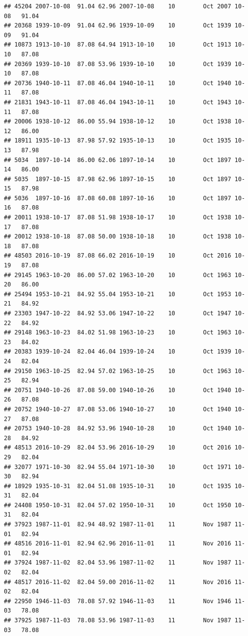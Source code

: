 \documentclass{article}\usepackage[]{graphicx}\usepackage[]{color}
\makeatletter
\newenvironment{kframe}{%
 \def\at@end@of@kframe{}%
 \ifinner\ifhmode%
  \def\at@end@of@kframe{\end{minipage}}%
  \begin{minipage}{\columnwidth}%
 \fi\fi%
 \def\FrameCommand##1{\hskip\@totalleftmargin \hskip-\fboxsep
 \colorbox{shadecolor}{##1}\hskip-\fboxsep
     \hskip-\linewidth \hskip-\@totalleftmargin \hskip\columnwidth}%
 \MakeFramed {\advance\hsize-\width
   \@totalleftmargin\z@ \linewidth\hsize
   \@setminipage}}%
 {\par\unskip\endMakeFramed%
 \at@end@of@kframe}
\newenvironment{knitrout}{}{} %
\makeatother
\begin{document}
\begin{knitrout}
\begin{kframe}
\begin{verbatim}
## 45204 2007-10-08  91.04 62.96 2007-10-08    10        Oct 2007 10-08   91.04
## 20368 1939-10-09  91.04 62.96 1939-10-09    10        Oct 1939 10-09   91.04
## 10873 1913-10-10  87.08 64.94 1913-10-10    10        Oct 1913 10-10   87.08
## 20369 1939-10-10  87.08 53.96 1939-10-10    10        Oct 1939 10-10   87.08
## 20736 1940-10-11  87.08 46.04 1940-10-11    10        Oct 1940 10-11   87.08
## 21831 1943-10-11  87.08 46.04 1943-10-11    10        Oct 1943 10-11   87.08
## 20006 1938-10-12  86.00 55.94 1938-10-12    10        Oct 1938 10-12   86.00
## 18911 1935-10-13  87.98 57.92 1935-10-13    10        Oct 1935 10-13   87.98
## 5034  1897-10-14  86.00 62.06 1897-10-14    10        Oct 1897 10-14   86.00
## 5035  1897-10-15  87.98 62.96 1897-10-15    10        Oct 1897 10-15   87.98
## 5036  1897-10-16  87.08 60.08 1897-10-16    10        Oct 1897 10-16   87.08
## 20011 1938-10-17  87.08 51.98 1938-10-17    10        Oct 1938 10-17   87.08
## 20012 1938-10-18  87.08 50.00 1938-10-18    10        Oct 1938 10-18   87.08
## 48503 2016-10-19  87.08 66.02 2016-10-19    10        Oct 2016 10-19   87.08
## 29145 1963-10-20  86.00 57.02 1963-10-20    10        Oct 1963 10-20   86.00
## 25494 1953-10-21  84.92 55.04 1953-10-21    10        Oct 1953 10-21   84.92
## 23303 1947-10-22  84.92 53.06 1947-10-22    10        Oct 1947 10-22   84.92
## 29148 1963-10-23  84.02 51.98 1963-10-23    10        Oct 1963 10-23   84.02
## 20383 1939-10-24  82.04 46.04 1939-10-24    10        Oct 1939 10-24   82.04
## 29150 1963-10-25  82.94 57.02 1963-10-25    10        Oct 1963 10-25   82.94
## 20751 1940-10-26  87.08 59.00 1940-10-26    10        Oct 1940 10-26   87.08
## 20752 1940-10-27  87.08 53.06 1940-10-27    10        Oct 1940 10-27   87.08
## 20753 1940-10-28  84.92 53.96 1940-10-28    10        Oct 1940 10-28   84.92
## 48513 2016-10-29  82.04 53.96 2016-10-29    10        Oct 2016 10-29   82.04
## 32077 1971-10-30  82.94 55.04 1971-10-30    10        Oct 1971 10-30   82.94
## 18929 1935-10-31  82.04 51.08 1935-10-31    10        Oct 1935 10-31   82.04
## 24408 1950-10-31  82.04 57.02 1950-10-31    10        Oct 1950 10-31   82.04
## 37923 1987-11-01  82.94 48.92 1987-11-01    11        Nov 1987 11-01   82.94
## 48516 2016-11-01  82.94 62.96 2016-11-01    11        Nov 2016 11-01   82.94
## 37924 1987-11-02  82.04 53.96 1987-11-02    11        Nov 1987 11-02   82.04
## 48517 2016-11-02  82.04 59.00 2016-11-02    11        Nov 2016 11-02   82.04
## 22950 1946-11-03  78.08 57.92 1946-11-03    11        Nov 1946 11-03   78.08
## 37925 1987-11-03  78.08 53.96 1987-11-03    11        Nov 1987 11-03   78.08

\end{verbatim}
\end{kframe}
\end{knitrout}
\end{document}
